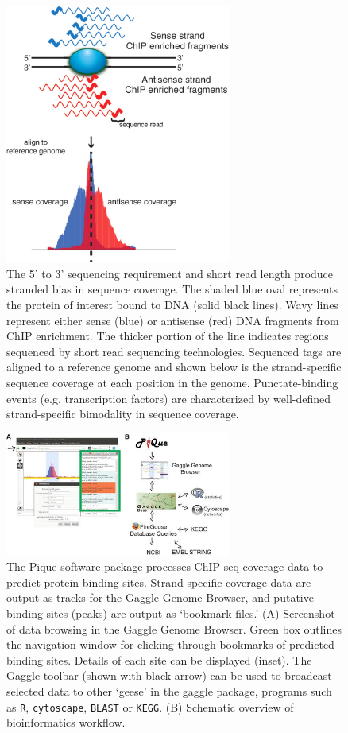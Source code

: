 \begin{figure}
\centering
\includegraphics[width=20em]{SaltyBugs/figures/fig2}
\caption{The 5' to 3' sequencing requirement and short read length produce stranded bias in sequence coverage. The shaded blue oval represents the protein of interest bound to DNA (solid black lines). Wavy lines represent either sense (blue) or antisense (red) DNA fragments from ChIP enrichment. The thicker portion of the line indicates regions sequenced by short read sequencing technologies. Sequenced tags are aligned to a reference genome and shown below is the strand-specific sequence coverage at each position in the genome. Punctate-binding events (e.g. transcription factors) are characterized by well-defined strand-specific bimodality in sequence coverage.}
\label{SB_fig2}
\end{figure}


\begin{figure}
\centering
\includegraphics[width=20em]{SaltyBugs/figures/fig3}
\caption{The Pique software package processes ChIP-seq coverage data to predict protein-binding sites. Strand-specific coverage data are output as tracks for the Gaggle Genome Browser, and putative-binding sites (peaks) are output as `bookmark files.' (A) Screenshot of data browsing in the Gaggle Genome Browser. Green box outlines the navigation window for clicking through bookmarks of predicted binding sites. Details of each site can be displayed (inset). The Gaggle toolbar (shown with black arrow) can be used to broadcast selected data to other ‘geese’ in the gaggle package, programs such as {\tt R}, {\tt cytoscape}, {\tt BLAST} or {\tt KEGG}. (B) Schematic overview of bioinformatics workflow.}
\label{SB_fig3}
\end{figure}

